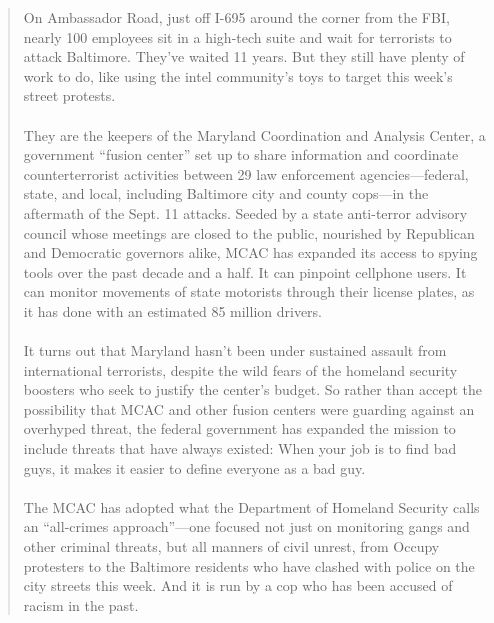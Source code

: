 
\begin{quotation}
    On Ambassador Road, just off I-695 around the corner from the FBI, nearly 100 employees sit in a high-tech suite and wait for terrorists to attack Baltimore. 
    They’ve waited 11 years. But they still have plenty of work to do, like using the intel community’s toys to target this week’s street protests.

  \paragraph{} They are the keepers of the Maryland Coordination and Analysis Center, a government “fusion center” set up to share information and coordinate counterterrorist activities between 29 law enforcement agencies—federal, 
      state, and local, including Baltimore city and county cops—in the aftermath of the Sept. 11 attacks. 
    Seeded by a state anti-terror advisory council whose meetings are closed to the public, nourished by Republican and Democratic governors alike, MCAC has expanded its access to spying tools over the past decade and a half. 
    It can pinpoint cellphone users. It can monitor movements of state motorists through their license plates, as it has done with an estimated 85 million drivers.

  \paragraph{} It turns out that Maryland hasn’t been under sustained assault from international terrorists, despite the wild fears of the homeland security boosters who seek to justify the center’s budget. 
    So rather than accept the possibility that MCAC and other fusion centers were guarding against an overhyped threat, the federal government has expanded the mission to include threats that have always existed: 
    When your job is to find bad guys, it makes it easier to define everyone as a bad guy.

  \paragraph{} The MCAC has adopted what the Department of Homeland Security calls an “all-crimes approach”—one focused not just on monitoring gangs and other criminal threats, but all manners of civil unrest, 
      from Occupy protesters to the Baltimore residents who have clashed with police on the city streets this week. And it is run by a cop who has been accused of racism in the past.

\end{quotation}

